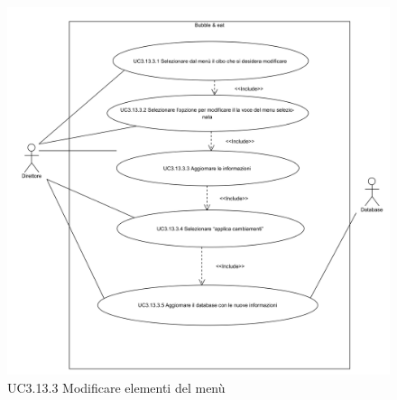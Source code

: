 \begin{figure}[H]
	\centering
	\includegraphics[width=15cm]{../../documenti/AnalisiDeiRequisiti/Diagrammi_img/uc3_13_3.png}
	\caption{UC3.13.3 Modificare elementi del menù}
\end{figure}

